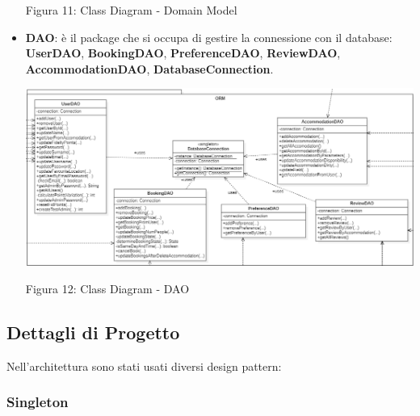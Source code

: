 \documentclass[10pt]{article}
\begin{document}
\begin{itemize}
\par\medskip
\begin{center}
Figura 11: Class Diagram - Domain Model 
\end{center}
\par\medskip
\vspace{-0.3cm}
\item \textbf{DAO}: è il package che si occupa di gestire la connessione con il database: \textbf{UserDAO}, \textbf{BookingDAO}, \textbf{PreferenceDAO}, \textbf{ReviewDAO}, \textbf{AccommodationDAO}, \textbf{DatabaseConnection}.
\vspace{0.1cm}
\par\medskip
\hspace*{-0.5cm}
\includegraphics[scale=0.58]{uml/DAO}
\par\medskip
\begin{center}
Figura 12: Class Diagram - DAO
\end{center}
\par\medskip
\end{itemize}
\subsection{Dettagli di Progetto}
Nell'architettura sono stati usati diversi design pattern:
\subsubsection{Singleton}
\end{document}
